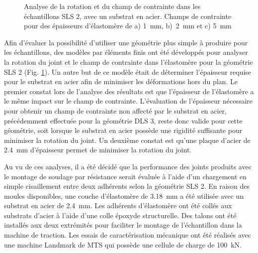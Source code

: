 \begin{figure}[h]
	\centering
	\qquad
	\caption{Analyse de la rotation et du champ de contrainte dans les échantillons SLS 2, avec un substrat en acier. Champs de contrainte pour des épaisseurs d'élastomère de a) \SI{1}{\milli\metre}, b)~\SI{2}{\milli\metre} et c) \SI{5}{\milli\metre}}
	\label{fig:SLS_metal}
\end{figure}

Afin d'évaluer la possibilité d'utiliser une géométrie plus simple à produire pour les échantillons, des modèles par éléments finis ont été développés pour analyser la rotation du joint et le champ de contrainte dans l'élastomère pour la géométrie SLS 2 (Fig. \ref{fig:SLS_metal}). 
Un autre but de ce modèle était de déterminer l'épaisseur requise pour le substrat en acier afin de minimiser les déformations hors du plan.  
Le premier constat lors de l'analyse des résultats est que l'épaisseur de l'élastomère a le même impact sur le champ de contrainte. 
L'évaluation de l'épaisseur nécessaire pour obtenir un champ de contrainte non affecté par le substrat en acier, précédemment effectuée pour la géométrie DLS 3, reste donc valide pour cette géométrie, soit lorsque le substrat en acier possède une rigidité suffisante pour minimiser la rotation du joint. 
Un deuxième constat est qu'une plaque d'acier de \SI[locale=FR]{2.4}{\milli\metre} d'épaisseur permet de minimiser la rotation du joint. 

Au vu de ces analyses, il a été décidé que la performance des joints produits avec le montage de soudage par résistance serait évaluée à l'aide d'un chargement en simple cisaillement entre deux adhérents selon la géométrie SLS 2. 
En raison des moules disponibles, une couche d'élastomère de \SI[locale=FR]{3.18}{\milli\metre} a été utilisée avec un substrat en acier de \SI[locale=FR]{2.4}{\milli\metre}. 
Les adhérents d'élastomère ont été collés aux substrats d'acier à l'aide d'une colle époxyde structurelle. 
Des talons ont été installés aux deux extrémités pour faciliter le montage de l'échantillon dans la machine de traction. 
Les essais de caractérisation mécanique ont été réalisés avec une machine Landmark de MTS qui possède une cellule de charge de \SI[locale=FR]{100}{\kilo\newton}. 

